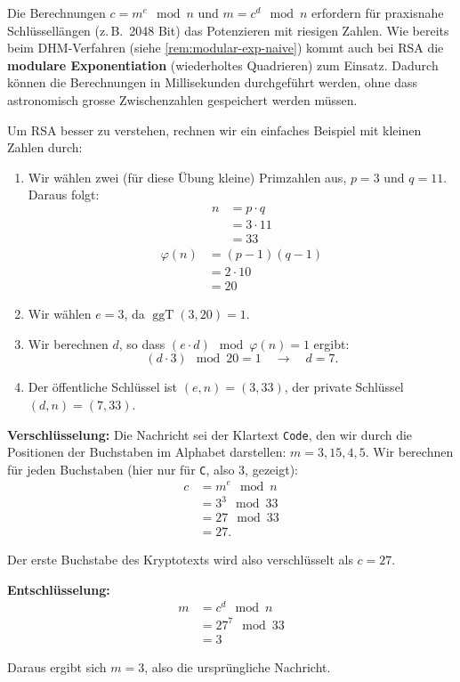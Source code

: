 \begin{myremark}\label{rem:rsa-mod-exp}
	Die Berechnungen $c = m^e \mod n$ und $m = c^d \mod n$ erfordern für praxisnahe Schlüssellängen (z.\,B.\ 2048 Bit) das Potenzieren mit riesigen Zahlen. Wie bereits beim \gls{DHM}-Verfahren (siehe \cref{rem:modular-exp-naive}) kommt auch bei \gls{RSA} die \textbf{modulare Exponentiation} (wiederholtes Quadrieren) zum Einsatz. Dadurch können die Berechnungen in Millisekunden durchgeführt werden, ohne dass astronomisch grosse Zwischenzahlen gespeichert werden müssen.
\end{myremark}

\begin{myexample}
Um \gls{RSA} besser zu verstehen, rechnen wir ein einfaches Beispiel mit kleinen Zahlen durch:
\begin{enumerate}
	\item Wir wählen zwei (für diese Übung kleine) Primzahlen aus, \( p = 3 \) und \( q = 11 \). Daraus folgt:
	      \begin{align*}
		      n & = p \cdot q  \\
		        & = 3 \cdot 11 \\
		        & = 33
	      \end{align*}
	      \begin{align*}
		      \varphi(n) & = (p-1)(q-1) \\
		                 & = 2 \cdot 10 \\
		                 & = 20
	      \end{align*}
	\item Wir wählen \( e = 3 \), da \( \operatorname{ggT}(3, 20) = 1 \).
	\item Wir berechnen \( d \), so dass \( (e \cdot d) \mod \varphi(n) = 1  \) ergibt:
	      \[
		      (d \cdot 3) \mod 20 = 1  \quad \rightarrow \quad d = 7.
	      \]
	\item Der öffentliche Schlüssel ist \( (e, n) = (3, 33) \), der private Schlüssel \( (d, n) = (7, 33) \).
\end{enumerate}

\textbf{Verschlüsselung:} Die Nachricht sei der Klartext \texttt{Code}, den wir durch die Positionen der Buchstaben im Alphabet darstellen: \( m = 3, 15, 4, 5 \). Wir berechnen für jeden Buchstaben (hier nur für \texttt{C}, also 3, gezeigt):
\begin{align*}
	c & = m^e \mod n  \\
	  & = 3^3 \mod 33 \\
	  & = 27 \mod 33  \\
	  & = 27.
\end{align*}


Der erste Buchstabe des Kryptotexts wird also verschlüsselt als \( c = 27\).

\textbf{Entschlüsselung:}
\begin{align*}
	m & = c^d \mod n     \\
	  & = 27^{7} \mod 33 \\
	  & = 3
\end{align*}

Daraus ergibt sich \( m = 3 \), also die ursprüngliche Nachricht.
\end{myexample}

